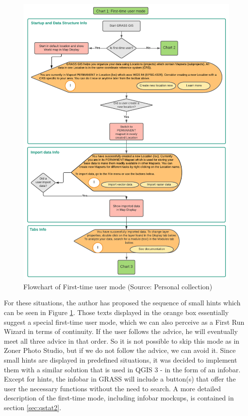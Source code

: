 \documentclass[a4paper,10pt,twoside]{article}
\begin{document}
\vspace{0.3cm}
\begin{figure}[hbt!] 
\begin{center}
\includegraphics[width=16cm]{../pictures/first-time_user_diagram.png} 
\caption[Flowchart of First-time user mode]{Flowchart of First-time user mode (Source: Personal collection)}
\label{fig:first-time_user_diagram}
\end{center}
\end{figure}

For these situations, the author has proposed the sequence of small
hints which can be seen in Figure
\ref{fig:first-time_user_diagram}. Those texts displayed in the orange
box essentially suggest a special first-time user mode, which we can
also perceive as a First Run Wizard in terms of continuity. If the
user follows the advice, he will eventually meet all three advice in
that order. So it is not possible to skip this mode as in Zoner Photo
Studio, but if we do not follow the advice, we can avoid it. Since
small hints are displayed in predefined situations, it was decided to
implement them with a similar solution that is used in QGIS 3 - in the
form of an infobar. Except for hints, the infobar in GRASS will include 
a button(s) that offer the user the
necessary functions without the need to search. A more detailed
description of the first-time mode, including infobar mockups, is
contained in section \ref{sec:qstat2}.
\end{document}
